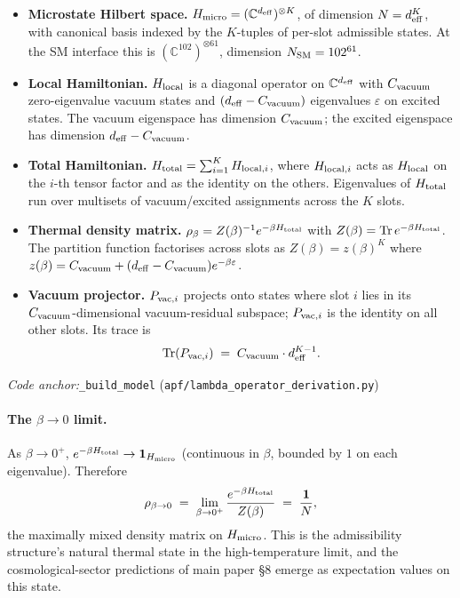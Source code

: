 \documentclass[11pt]{article}
\theoremstyle{plain}
\theoremstyle{definition}
\theoremstyle{remark}
\newcommand{\coderef}[2]{\par\noindent\textit{Code anchor:}\quad\texttt{#1} (\texttt{#2})}
\begin{document}
\begin{itemize}[leftmargin=2em,itemsep=4pt]
  \item \textbf{Microstate Hilbert space.}  $H_{\rm micro} = (\mathbb{C}^{d_{\rm eff}})^{\otimes K}$, of dimension $N = d_{\rm eff}^K$, with canonical basis indexed by the $K$-tuples of per-slot admissible states.  At the SM interface this is $(\mathbb{C}^{102})^{\otimes 61}$, dimension $N_{\rm SM} = 102^{61}$.
  \item \textbf{Local Hamiltonian.}  $H_{\rm local}$ is a diagonal operator on $\mathbb{C}^{d_{\rm eff}}$ with $C_{\rm vacuum}$ zero-eigenvalue vacuum states and $(d_{\rm eff} - C_{\rm vacuum})$ eigenvalues $\varepsilon$ on excited states.  The vacuum eigenspace has dimension $C_{\rm vacuum}$; the excited eigenspace has dimension $d_{\rm eff} - C_{\rm vacuum}$.
  \item \textbf{Total Hamiltonian.}  $H_{\rm total} = \sum_{i=1}^{K} H_{{\rm local},i}$, where $H_{{\rm local},i}$ acts as $H_{\rm local}$ on the $i$-th tensor factor and as the identity on the others.  Eigenvalues of $H_{\rm total}$ run over multisets of vacuum/excited assignments across the $K$ slots.
  \item \textbf{Thermal density matrix.}  $\rho_\beta = Z(\beta)^{-1} e^{-\beta H_{\rm total}}$ with $Z(\beta) = \mathrm{Tr}\,e^{-\beta H_{\rm total}}$.  The partition function factorises across slots as $Z(\beta) = z(\beta)^K$ where $z(\beta) = C_{\rm vacuum} + (d_{\rm eff} - C_{\rm vacuum}) e^{-\beta \varepsilon}$.
  \item \textbf{Vacuum projector.}  $P_{{\rm vac},i}$ projects onto states where slot $i$ lies in its $C_{\rm vacuum}$-dimensional vacuum-residual subspace; $P_{{\rm vac},i}$ is the identity on all other slots.  Its trace is
  \[
    \mathrm{Tr}(P_{{\rm vac},i}) \;=\; C_{\rm vacuum} \cdot d_{\rm eff}^{K-1}.
  \]
\end{itemize}

\coderef{\_build\_model}{apf/lambda\_operator\_derivation.py}

\paragraph{The $\beta \to 0$ limit.}  As $\beta \to 0^+$, $e^{-\beta H_{\rm total}} \to \mathbf{1}_{H_{\rm micro}}$ (continuous in $\beta$, bounded by $1$ on each eigenvalue).  Therefore
\[
  \rho_{\beta \to 0}
  \;=\; \lim_{\beta \to 0^+} \frac{e^{-\beta H_{\rm total}}}{Z(\beta)}
  \;=\; \frac{\mathbf{1}}{N},
\]
the maximally mixed density matrix on $H_{\rm micro}$.  This is the admissibility structure's natural thermal state in the high-temperature limit, and the cosmological-sector predictions of main paper \S8 emerge as expectation values on this state.
\end{document}
